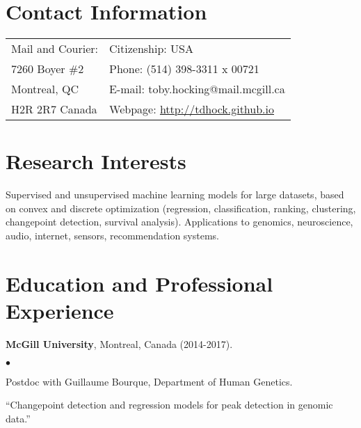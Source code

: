 \documentclass[margin,line]{res}
\newenvironment{list2}{
  \begin{list}{$\bullet$}{%
      \setlength{\itemsep}{0in}
      \setlength{\parsep}{0in} \setlength{\parskip}{0in}
      \setlength{\topsep}{0in} \setlength{\partopsep}{0in} 
      \setlength{\leftmargin}{0.2in}}}{\end{list}}
\begin{document}

\begin{resume}
\section{\sc Contact Information}
\vspace{.05in}
\begin{tabular*}{6.1in} {@{\extracolsep{\fill}}ll}
 Mail and Courier: & Citizenship: USA \\            
 7260 Boyer \#2  & Phone:  (514) 398-3311 x 00721 \\   
Montreal, QC & E-mail:  toby.hocking@mail.mcgill.ca       \\
H2R 2R7 Canada &  Webpage: \url{http://tdhock.github.io}\\     
\end{tabular*}


\section{\sc Research Interests}

Supervised and unsupervised machine learning models for large
datasets, based on convex and discrete optimization (regression,
classification, ranking, clustering, changepoint detection, survival
analysis). Applications to genomics, neuroscience,
audio, internet, sensors, recommendation systems.


\section{\sc Education and Professional Experience}

{\bf McGill University}, Montreal, Canada (2014-2017).\\
\vspace*{-.1in}
\begin{list2}
\item[] Postdoc with Guillaume Bourque, Department of Human Genetics.
\item[]``Changepoint detection and regression models for peak detection in genomic data.''
\end{list2}


\end{resume}
\end{document}

